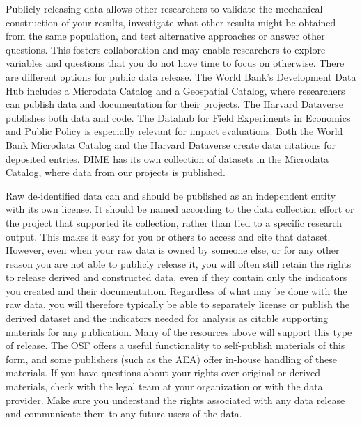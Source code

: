 Publicly releasing data allows other researchers
to validate the mechanical construction of your results,
investigate what other results might be obtained from the same population,
and test alternative approaches or answer other questions.
This fosters collaboration and may enable researchers to explore variables and
questions that you do not have time to focus on otherwise.
There are different options for public data release.
The World Bank's Development Data Hub
includes a Microdata Catalog
and a Geospatial Catalog,
where researchers can publish data and documentation for their projects.
The Harvard Dataverse
publishes both data and code.
The Datahub for Field Experiments in Economics and Public Policy
is especially relevant for impact evaluations.
Both the World Bank Microdata Catalog and the Harvard Dataverse
create data citations for deposited entries.
DIME has its own collection of datasets in the Microdata Catalog,
where data from our projects is published.

Raw de-identified data can and should be published
as an independent entity with its own license.
It should be named according to the data collection effort
or the project that supported its collection,
rather than tied to a specific research output.
This makes it easy for you or others to access and cite that dataset.
However, even when your raw data is owned by someone else,
or for any other reason you are not able to publicly release it,
you will often still retain the rights to release derived and constructed data,
even if they contain only the indicators you created and their documentation.
Regardless of what may be done with the raw data,
you will therefore typically be able to separately license or publish
the derived dataset and the indicators needed for analysis
as citable supporting materials for any publication.
Many of the resources above will support this type of release.
The OSF offers a useful functionality to self-publish materials of this form,
and some publishers (such as the AEA) offer in-house handling of these materials.
If you have questions about your rights over original or derived materials,
check with the legal team at your organization or with the data provider.
Make sure you understand the rights associated with any data release
and communicate them to any future users of the data.

